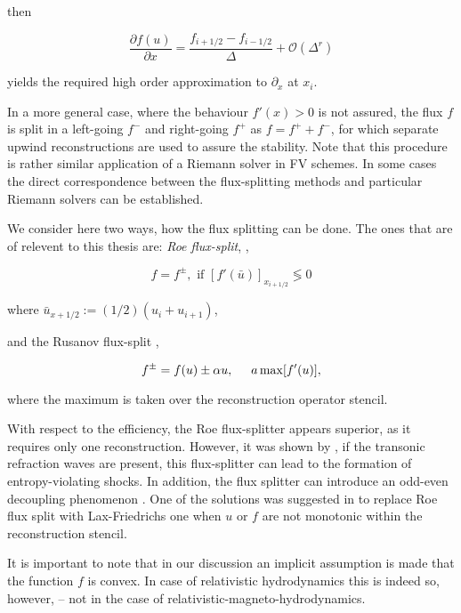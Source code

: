 then

\begin{equation}
\frac{\partial f(u)}{\partial x} = \frac{f_{i+1/2} - f_{i-1/2}}{\Delta} + \mathcal{O}(\Delta^r)
\end{equation}

yields the required high order approximation to $\partial_x$ at $x_i$. 

In a more general case, where the behaviour $f'(x)>0$ is not assured, the flux $f$ is split in a left-going $f^{-}$ and right-going $f^{+}$ as $f = f^{+} + f^{-}$, for which separate upwind reconstructions are used to assure the stability. Note that this procedure is rather similar application of a Riemann solver in \ac{FV} schemes. 
In some cases the direct correspondence between the flux-splitting methods and particular Riemann solvers can be established. 

We consider here two ways, how the flux splitting can be done. 
The ones that are of relevent to this thesis are: \textit{Roe flux-split}, \ie,

\begin{equation}
f = f^{\pm}, \text{  if  } [f'(\bar{u})]_{x_{i+1/2}} \lessgtr 0
\label{eq:theory:fd:roefluxsplit}
\end{equation}

where $\bar{u}_{x+1/2} := (1/2) (u_i + u_{i+1})$, 

and the Rusanov flux-split \citep{Shu:1997} \ie,

\begin{equation}
f^{\pm} = f(u) \pm \alpha u, \hspace{5mm} a \max[f'(u)],
\label{eq:theory:fd:laxfluxsplit}
\end{equation}

where the maximum is taken over the reconstruction operator stencil. 

With respect to the efficiency, the Roe flux-splitter appears superior, as it requires only one reconstruction. However, it was shown by \citet{LeVeque:1992}, if the transonic refraction waves are present, this flux-splitter can lead to the formation of entropy-violating shocks. In addition, the flux splitter can introduce an odd-even decoupling phenomenon \citep{Quirk:1994}. One of the solutions was suggested in \citet{Radice:2012cu} to replace Roe flux split with Lax-Friedrichs one when $u$ or $f$ are not monotonic within the reconstruction stencil. 

It is important to note that in our discussion an implicit assumption is made that the function $f$ is convex. 
In case of relativistic hydrodynamics this is indeed so, however, -- not in the case of relativistic-magneto-hydrodynamics. 

